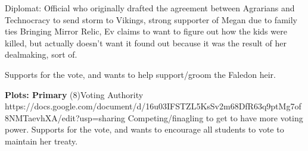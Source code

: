 \documentclass[char]{GL2020}
\begin{document}
\name{\cDiplomat{}}







Diplomat: Official who originally drafted the agreement between Agrarians and Technocracy to send storm to Vikings, 	strong supporter of Megan due to family ties	Bringing Mirror Relic, Ev claims to want to figure out how the kids were killed, but actually doesn't want it found out because it was the result of her dealmaking, sort of.

Supports \cHeir{} for the vote, and wants to help support/groom the Faledon heir.

\textbf{Plots: Primary}
(8)Voting Authority
https://docs.google.com/document/d/16u03IFSTZL5KsSv2m68DfR63q9ptMg7of8NMTaevhXA/edit?usp=sharing
Competing/finagling to get to have more voting power.  Supports \cHeir{} for the vote, and wants to encourage all students to vote to maintain her treaty.
\end{document}
